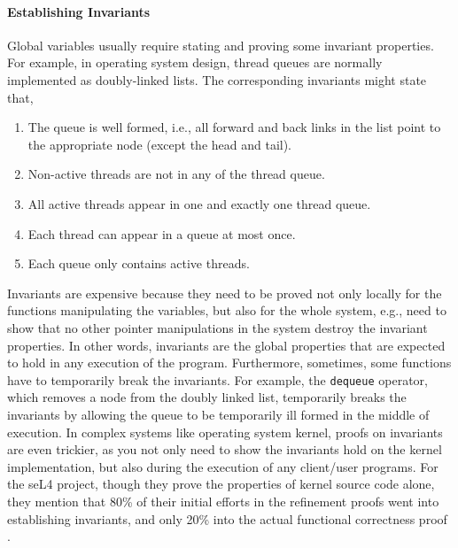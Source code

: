 \paragraph{Establishing Invariants}
Global variables usually require stating and proving some invariant properties.
For example, in operating system design, thread queues are normally implemented
as doubly-linked lists. The corresponding invariants might state that,
\begin{invariant}
\begin{enumerate}
\item The queue is well formed, i.e., all forward and back links in the list
point to the appropriate node (except the head and tail).
\item Non-active threads are not in any of the thread queue.
\item All active threads appear in one and exactly one thread queue.
\item Each thread can appear in a queue at most once.
\item Each queue only contains active threads.
\end{enumerate}
\end{invariant}
Invariants are expensive because they need to be proved not only
locally for the functions manipulating the variables, but also for the whole system,
e.g., need to show that no other pointer manipulations in the system
destroy the invariant properties. 
In other words, invariants are the global properties that are expected to hold
in any execution of the program.
Furthermore, sometimes, some functions have
to temporarily break the invariants. For example, the \verb+dequeue+ operator,
which removes a node from the doubly linked list, temporarily breaks the invariants
by allowing the queue to be temporarily ill formed in the middle of execution.
In complex systems like operating system kernel, proofs on invariants are even
trickier, as you not only need to show the invariants hold on the kernel implementation,
but also during the execution of any client/user programs.
For the seL4 project, though they prove the properties of kernel source code alone,
they mention that 80\% of their initial efforts in the
refinement proofs went into establishing invariants, and only 20\% into the
actual functional correctness proof \cite{klein2009sel4}.

